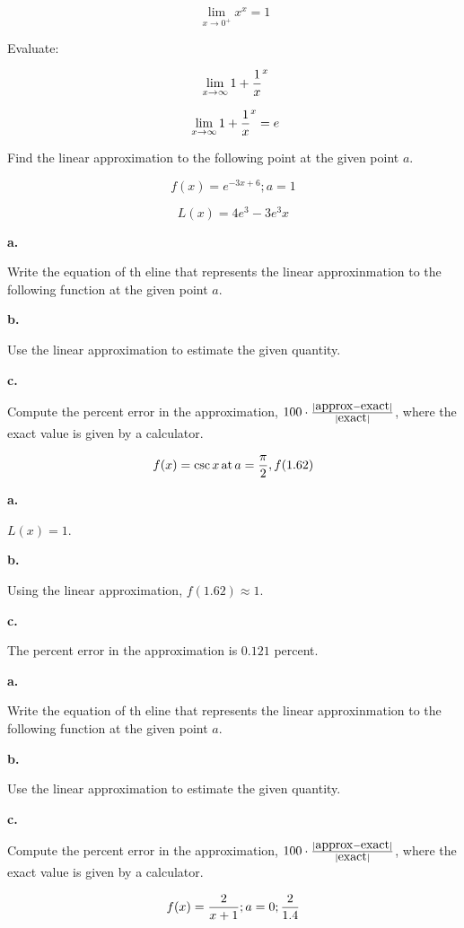 
$$\
\lim_{x \to 0^+} x^x = 1
$$

Evaluate:

$$\
\lim_{x \to \infty} {1 + {1 \over x}}^x
$$

$$\
\lim_{x \to \infty} {1 + {1 \over x}}^x = e
$$

Find the linear approximation to the following point at the
given point $a$.

$$
f(x) = e^{-3x + 6}; a = 1
$$

$$
L(x) = 4e^3 - 3e^3 x
$$

{\par \bf a.}
Write the equation of th eline that represents the linear approxinmation
to the following function at the given point $a$.

{\par \bf b.}
Use the linear approximation to estimate the given quantity.

{\par \bf c.}
Compute the percent error in the approximation, $100 \cdot {|\hbox{approx} - \hbox{exact}| \over |\hbox{exact}|}$,
where the exact value is given by a calculator.

$$
f(x) = \csc x \, \hbox{at} \, a = {\pi \over 2}, f(1.62)
$$

{\par \bf a.}
$L(x) = 1$.

{\par \bf b.}
Using the linear approximation, $f(1.62) \approx 1$.

{\par \bf c.}
The percent error in the approximation is $0.121$ percent.

{\par \bf a.}
Write the equation of th eline that represents the linear approxinmation
to the following function at the given point $a$.

{\par \bf b.}
Use the linear approximation to estimate the given quantity.

{\par \bf c.}
Compute the percent error in the approximation, $100 \cdot {|\hbox{approx} - \hbox{exact}| \over |\hbox{exact}|}$,
where the exact value is given by a calculator.

$$
f(x) = {2 \over x + 1}; a = 0; {2 \over 1.4}
$$


